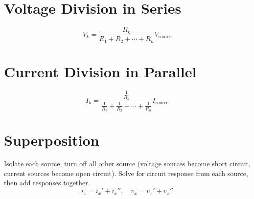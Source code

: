 \documentclass[12pt]{article}
\begin{document}
\section*{Voltage Division in Series}
\[V_k = \frac{R_k}{R_1 + R_2 + \cdots + R_n} V_\text{source}\]
\section*{Current Division in Parallel}
\[I_k = \frac{\frac{1}{R_k}}{\frac{1}{R_1} + \frac{1}{R_2} + \cdots + \frac{1}{R_n}} I_\text{source}\]
\section*{Superposition}
Isolate each source, turn off all other source (voltage sources become short circuit, current sources become open circuit). Solve for circuit response from each source, then add responses together.
\[i_x = i_x'+ i_x'', \quad v_x = v_x'+ v_x''\]
\end{document}
